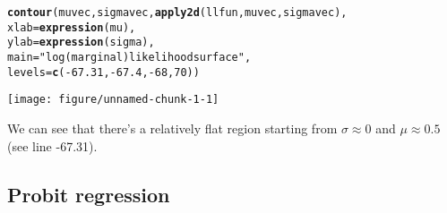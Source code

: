 \documentclass{article}\usepackage[]{graphicx}\usepackage[]{color}
\makeatletter
\def\maxwidth{ %
  \ifdim\Gin@nat@width>\linewidth
    \linewidth
  \else
    \Gin@nat@width
  \fi
}
\newcommand{\hlnum}[1]{\textcolor[rgb]{0.686,0.059,0.569}{#1}}%
\newcommand{\hlstr}[1]{\textcolor[rgb]{0.192,0.494,0.8}{#1}}%
\newcommand{\hlopt}[1]{\textcolor[rgb]{0,0,0}{#1}}%
\newcommand{\hlstd}[1]{\textcolor[rgb]{0.345,0.345,0.345}{#1}}%
\newcommand{\hlkwc}[1]{\textcolor[rgb]{0.333,0.667,0.333}{#1}}%
\newcommand{\hlkwd}[1]{\textcolor[rgb]{0.737,0.353,0.396}{\textbf{#1}}}%
\newenvironment{kframe}{%
 \def\at@end@of@kframe{}%
 \ifinner\ifhmode%
  \def\at@end@of@kframe{\end{minipage}}%
  \begin{minipage}{\columnwidth}%
 \fi\fi%
 \def\FrameCommand##1{\hskip\@totalleftmargin \hskip-\fboxsep
 \colorbox{shadecolor}{##1}\hskip-\fboxsep
     \hskip-\linewidth \hskip-\@totalleftmargin \hskip\columnwidth}%
 \MakeFramed {\advance\hsize-\width
   \@totalleftmargin\z@ \linewidth\hsize
   \@setminipage}}%
 {\par\unskip\endMakeFramed%
 \at@end@of@kframe}
\newenvironment{knitrout}{}{} %
\makeatother
\begin{document}
\begin{knitrout}
\begin{kframe}
\begin{alltt}
\hlkwd{contour}\hlstd{(muvec, sigmavec,} \hlkwd{apply2d}\hlstd{(llfun, muvec, sigmavec),}
                \hlkwc{xlab}\hlstd{=}\hlkwd{expression}\hlstd{(mu),}
                \hlkwc{ylab}\hlstd{=}\hlkwd{expression}\hlstd{(sigma),}
                \hlkwc{main}\hlstd{=}\hlstr{"log (marginal) likelihood surface"}\hlstd{,}
                \hlkwc{levels}\hlstd{=}\hlkwd{c}\hlstd{(}\hlopt{-}\hlnum{67.31}\hlstd{,} \hlopt{-}\hlnum{67.4}\hlstd{,} \hlopt{-}\hlnum{68}\hlstd{,} \hlnum{70}\hlstd{))}
\end{alltt}
\end{kframe}
\texttt{[image: figure/unnamed-chunk-1-1]} 

\end{knitrout}

We can see that there's a relatively flat region starting from $\sigma \approx 0$ and $\mu \approx 0.5$ (see line -67.31).

\subsection{Probit regression}
\end{document}
